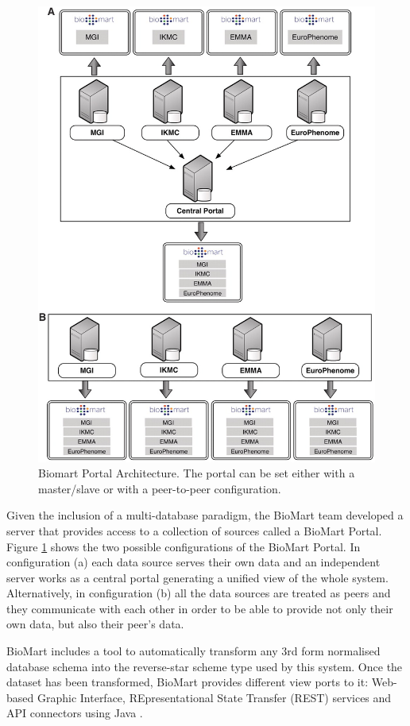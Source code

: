 \begin{figure}  
\centering
\includegraphics[width=5in]{figures/biomart.png}
\caption[Biomart Portal Architecture.]{Biomart Portal Architecture. The portal can be set either with a master/slave or with a peer-to-peer configuration.
\label{fig:biomart}}
\end{figure}

Given the inclusion of a multi-database paradigm, the BioMart team developed a server that provides access to a collection of sources called a BioMart Portal. Figure \ref{fig:biomart} shows the two possible configurations of the BioMart Portal. In configuration (a) each data source serves their own data and an independent server works as a central portal generating a unified view of the whole system. Alternatively, in configuration (b) all the data sources are treated as peers and they communicate with each other in order to be able to provide not only their own data, but also their peer's data.

BioMart includes a tool to automatically transform any 3rd form normalised database schema into the reverse-star scheme type used by this system. Once the dataset has been transformed, BioMart provides different view ports to it: Web-based Graphic Interface, REpresentational State Transfer (REST) services and API connectors using Java \cite{KAS2011}.


